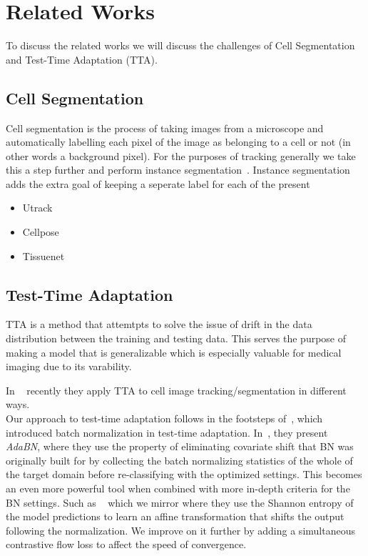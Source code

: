 \section{Related Works}
To discuss the related works we will discuss the challenges of Cell Segmentation and Test-Time Adaptation (TTA).

\subsection{Cell Segmentation}

Cell segmentation is the process of taking images from a microscope and automatically labelling each pixel of the image as belonging to a cell or not (in other words a background pixel).  For the purposes of tracking generally we take this a step further and perform instance segmentation~\cite{INSTANCESEG}.  Instance segmentation adds the extra goal of keeping a seperate label for each of the present 


\begin{itemize}

 

    \item Utrack 
    \item Cellpose
    \item Tissuenet
    
\end{itemize}

\subsection{Test-Time Adaptation}

TTA is a method that attemtpts to solve the issue of drift in the data distribution between the training and testing data. This serves the purpose of making a model that is generalizable which is especially valuable for medical imaging due to its varability. 

In ~\cite{chen2024cmtt,Moshkov2020-uy} recently they apply TTA to cell image tracking/segmentation in different ways.\\

Our approach to test-time adaptation follows in the footsteps of~\cite{Li2018-el}, which introduced batch normalization in test-time adaptation. In~\cite{Li2018-el}, they present \textit{AdaBN}, where they use the property of eliminating covariate shift that BN was originally built for by collecting the batch normalizing statistics of the whole of the target domain before re-classifying with the optimized settings.  This becomes an even more powerful tool when combined with more in-depth criteria for the BN settings.  Such as ~\cite{wang2020tent} which we mirror where they use the Shannon entropy of the model predictions to learn an affine transformation that shifts the output following the normalization.  We improve on it further by adding a simultaneous contrastive flow loss to affect the speed of convergence.\\




